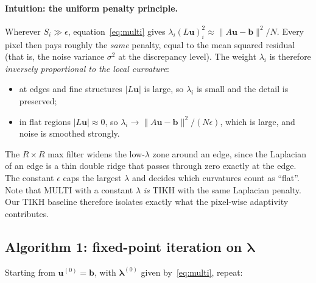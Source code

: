\paragraph{Intuition: the uniform penalty principle.}
Wherever $S_i\gg\epsilon$, equation~\eqref{eq:multi} gives
$\lambda_i (L\mathbf u)_i^2\approx\|A\mathbf u-\mathbf b\|^2/N$. Every pixel then
pays roughly the \emph{same} penalty, equal to the mean squared residual (that is,
the noise variance $\sigma^2$ at the discrepancy level). The weight
$\lambda_i$ is therefore \emph{inversely proportional to the local curvature}:
\begin{itemize}[leftmargin=*,itemsep=1pt]
\item at edges and fine structures $|L\mathbf u|$ is large, so $\lambda_i$ is small
  and the detail is preserved;
\item in flat regions $|L\mathbf u|\approx 0$, so $\lambda_i\to\|A\mathbf u-\mathbf b\|^2/(N\epsilon)$,
  which is large, and noise is smoothed strongly.
\end{itemize}
The $R\times R$ max filter widens the low-$\lambda$ zone around an edge, since the
Laplacian of an edge is a thin double ridge that passes through zero exactly at the
edge. The constant $\epsilon$ caps the largest $\lambda$ and decides which
curvatures count as ``flat''. Note that MULTI with a constant $\lambda$ \emph{is}
TIKH with the same Laplacian penalty. Our TIKH baseline therefore isolates exactly
what the pixel-wise adaptivity contributes.

\subsection{Algorithm 1: fixed-point iteration on $\boldsymbol\lambda$}
Starting from $\mathbf u^{(0)}=\mathbf b$, with
$\boldsymbol\lambda^{(0)}$ given by~\eqref{eq:multi}, repeat:

\begin{center}
\end{center}

